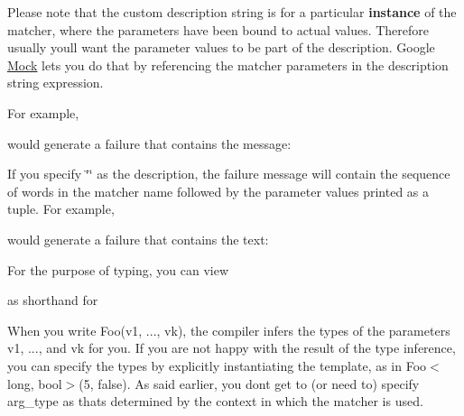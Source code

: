 Please note that the custom description string is for a particular {\bfseries{instance}} of the matcher, where the parameters have been bound to actual values. Therefore usually you\textquotesingle{}ll want the parameter values to be part of the description. Google \mbox{\hyperlink{classMock}{Mock}} lets you do that by referencing the matcher parameters in the description string expression.

For example, 
\begin{DoxyCode}{0}
\DoxyCodeLine{           std::string(negation ? "isn't" : "is") + " in range [" +}
\DoxyCodeLine{           PrintToString(low) + ", " + PrintToString(hi) + "]") \{}
\DoxyCodeLine{\}}
\end{DoxyCode}
 would generate a failure that contains the message\+: 
\begin{DoxyCode}{0}
\end{DoxyCode}


If you specify {\ttfamily \char`\"{}\char`\"{}} as the description, the failure message will contain the sequence of words in the matcher name followed by the parameter values printed as a tuple. For example, 
\begin{DoxyCode}{0}
\end{DoxyCode}
 would generate a failure that contains the text\+: 
\begin{DoxyCode}{0}
\end{DoxyCode}


For the purpose of typing, you can view 
\begin{DoxyCode}{0}
\end{DoxyCode}
 as shorthand for 
\begin{DoxyCode}{0}
\end{DoxyCode}


When you write {\ttfamily Foo(v1, ..., vk)}, the compiler infers the types of the parameters {\ttfamily v1}, ..., and {\ttfamily vk} for you. If you are not happy with the result of the type inference, you can specify the types by explicitly instantiating the template, as in {\ttfamily Foo$<$long, bool$>$(5, false)}. As said earlier, you don\textquotesingle{}t get to (or need to) specify {\ttfamily arg\+\_\+type} as that\textquotesingle{}s determined by the context in which the matcher is used.


